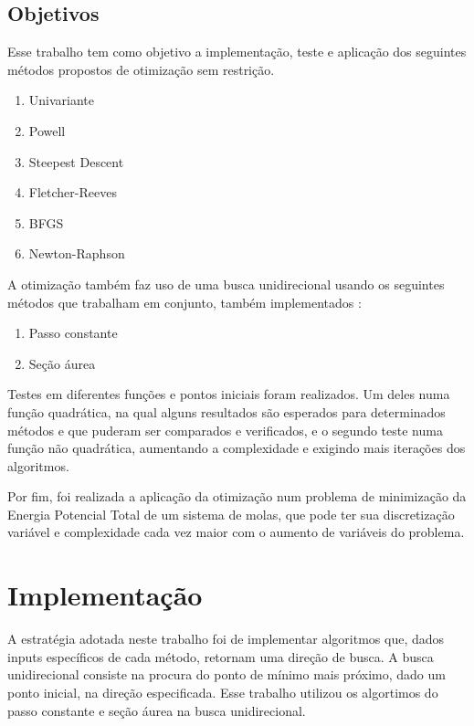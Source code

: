 \documentclass[10pt, a4paper]{article}
\begin{document}
\subsection{Objetivos}

Esse trabalho tem como objetivo a implementação, teste e aplicação dos seguintes métodos propostos de otimização sem restrição.

\renewcommand{\theenumi}{\alph{enumi}}
\begin{enumerate}
  \item Univariante
  \item Powell
  \item Steepest Descent
  \item Fletcher-Reeves
  \item BFGS
  \item Newton-Raphson
\end{enumerate}

A otimização também faz uso de uma busca unidirecional usando os seguintes métodos que trabalham em conjunto, também implementados :

\begin{enumerate}
  \item Passo constante
  \item Seção áurea
\end{enumerate}

Testes em diferentes funções e pontos iniciais foram realizados. Um deles numa função quadrática,
na qual alguns resultados são esperados para determinados métodos e que puderam ser comparados e verificados, 
e o segundo teste numa função não quadrática, aumentando a complexidade e exigindo mais iterações dos algoritmos.

Por fim, foi realizada a aplicação da otimização num problema de minimização da Energia Potencial Total de um sistema de molas,
que pode ter sua discretização variável e complexidade cada vez maior com o aumento de variáveis do problema.

\section{Implementação}

A estratégia adotada neste trabalho foi de implementar algoritmos que, dados inputs específicos de cada método, retornam uma direção de busca. A busca unidirecional consiste na procura 
do ponto de mínimo mais próximo, dado um ponto inicial, na direção especificada. Esse trabalho utilizou os algortimos do passo constante e seção áurea na busca unidirecional.
\end{document}
